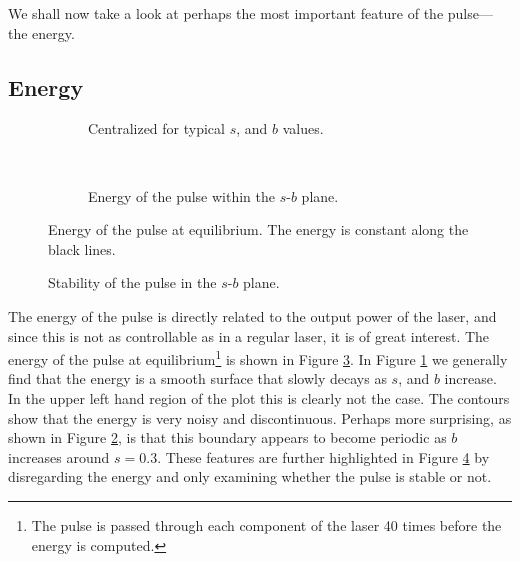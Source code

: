 We shall now take a look at perhaps the most important feature of the pulse---the energy. \\

\subsection{Energy}
\label{chap:energy}

\begin{figure}[p]
\centering
\begin{subfigure}{\textwidth}

\caption{Centralized for typical $s$, and $b$ values.}
\label{fig:energyzoom}
\end{subfigure} \\
\begin{subfigure}{\textwidth}

\caption{Energy of the pulse within the $s$-$b$ plane.}
\label{fig:energybig}
\end{subfigure}
\caption[Energy of the pulse at equilibrium.]{Energy of the pulse at equilibrium. The energy is constant along the black lines.}
\label{fig:energy}
\end{figure}

\begin{figure}[tbp]

\caption{Stability of the pulse in the $s$-$b$ plane.}
\label{fig:cartoon}
\end{figure}

The energy of the pulse is directly related to the output power of the laser, and since this is not as controllable as in a regular laser, it is of great interest. The energy of the pulse at equilibrium\footnote{The pulse is passed through each component of the laser 40 times before the energy is computed.} is shown in Figure \ref{fig:energy}. In Figure \ref{fig:energyzoom} we generally find that the energy is a smooth surface that slowly decays as $s$, and $b$ increase. In the upper left hand region of the plot this is clearly not the case. The contours show that the energy is very noisy and discontinuous. Perhaps more surprising, as shown in Figure \ref{fig:energybig}, is that this boundary appears to become periodic as $b$ increases around $s = 0.3$. These features are further highlighted in Figure \ref{fig:cartoon} by disregarding the energy and only examining whether the pulse is stable or not. \\


